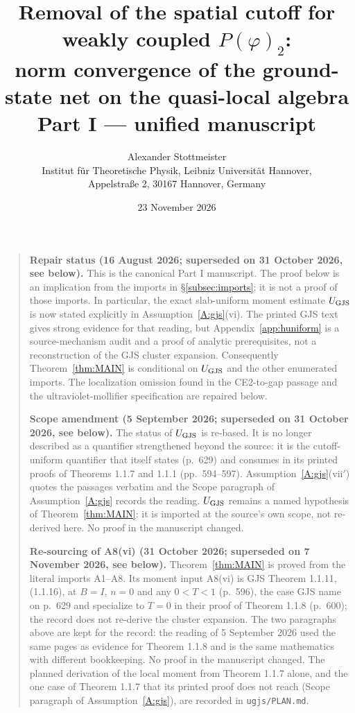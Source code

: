 \documentclass[11pt,a4paper]{article}
\title{Removal of the spatial cutoff for weakly coupled $P(\varphi)_2$:\\
norm convergence of the ground-state net on the quasi-local algebra\\[4pt]
\large Part I --- unified manuscript}
\author{Alexander Stottmeister\\[3pt]
  \normalsize Institut f\"ur Theoretische Physik, Leibniz Universit\"at Hannover,\\
  \normalsize Appelstra\ss e 2, 30167 Hannover, Germany}
\date{23 November 2026}
\theoremstyle{plain}
\theoremstyle{definition}
\theoremstyle{plain}
\theoremstyle{definition}
\begin{document}
\maketitle

\begin{quote}\small
\textbf{Repair status (16 August 2026; superseded on 31 October 2026, see below).} This is the canonical Part I manuscript.
The proof below is an implication from the imports in \S\ref{subsec:imports}; it is
not a proof of those imports.  In particular, the exact slab-uniform moment estimate
$U_{\rm GJS}$ is now stated explicitly in Assumption~\ref{A:gjs}(vi).  The printed
GJS text gives strong evidence for that reading, but Appendix~\ref{app:huniform} is a
source-mechanism audit and a proof of analytic prerequisites, not a reconstruction of
the GJS cluster expansion.  Consequently Theorem~\ref{thm:MAIN} is conditional on
$U_{\rm GJS}$ and the other enumerated imports.  The localization omission found in
the CE2-to-gap passage and the ultraviolet-mollifier specification are repaired below.

\smallskip
\textbf{Scope amendment (5 September 2026; superseded on 31 October 2026, see below).}  The status of $U_{\rm GJS}$ is re-based.
It is no longer described as a quantifier strengthened beyond the source: it is the
cutoff-uniform quantifier that \cite{GJS} itself states (p.~629) and consumes in its
printed proofs of Theorems 1.1.7 and 1.1.1 (pp.~594--597).  Assumption~\ref{A:gjs}(vii$'$)
quotes the passages verbatim and the Scope paragraph of Assumption~\ref{A:gjs} records
the reading.  $U_{\rm GJS}$ remains a named hypothesis of Theorem~\ref{thm:MAIN}: it is
imported at the source's own scope, not re-derived here.  No proof in the manuscript
changed.

\smallskip
\textbf{Re-sourcing of A8(vi) (31 October 2026; superseded on 7 November 2026, see below).}  Theorem~\ref{thm:MAIN} is proved from
the literal imports A1--A8.  Its moment input A8(vi) is GJS Theorem 1.1.11, (1.1.16), at
$B=I$, $n=0$ and any $0<T<1$ (p.~596), the case GJS name on p.~629 and specialize to
$T=0$ in their proof of Theorem 1.1.8 (p.~600); the record does not re-derive the cluster
expansion.  The two paragraphs above are kept for the record: the reading of
5 September 2026 used the same pages as evidence for Theorem 1.1.8 and is the same
mathematics with different bookkeeping.  No proof in the manuscript changed.  The planned
derivation of the local moment from Theorem 1.1.7 alone, and the one case of Theorem 1.1.7
that its printed proof does not reach (Scope paragraph of Assumption~\ref{A:gjs}), are
recorded in \texttt{ugjs/PLAN.md}.


\end{quote}
\end{document}
